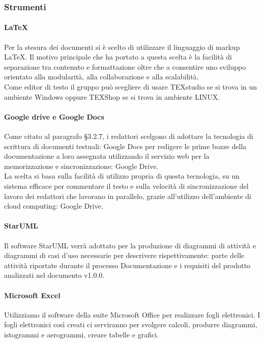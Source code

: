         \subsubsection{Strumenti}
            \paragraph{LaTeX}
                Per la stesura dei documenti si è scelto di utilizzare il linguaggio di markup LaTeX. Il motivo principale che ha portato a questa scelta è la facilità di separazione tra contenuto e formattazione oltre che a consentire uno sviluppo orientato alla modularità, alla collaborazione e alla scalabilità.\\
                Come editor di testo il gruppo può scegliere di usare TEXstudio se si trova in un ambiente Windows oppure TEXShop se si trova in ambiente LINUX.  \\
            \paragraph{Google drive e Google Docs}
                Come citato al paragrafo §3.2.7, i redattori scelgono di adottare la tecnologia di scrittura di documenti testuali: Google Docs per redigere le prime bozze della documentazione a loro assegnata utilizzando il servizio web per la memorizzazione e sincronizzazione: Google Drive. \\
                La scelta si basa sulla facilità di utilizzo propria di questa tecnologia, su un sistema efficace per commentare il testo e sulla velocità di sincronizzazione del lavoro dei redattori che lavorano in parallelo, grazie all’utilizzo dell’ambiente di cloud computing: Google Drive. \\
            \paragraph{StarUML}
                Il software StarUML verrà adottato per la produzione di diagrammi di attività e diagrammi di casi d’uso necessarie per descrivere rispettivamente: parte delle attività riportate durante il processo Documentazione e i requisiti del prodotto analizzati nel documento  v1.0.0.
            \paragraph{Microsoft Excel}
                Utilizziamo il software della suite Microsoft Office per realizzare fogli elettronici. I fogli elettronici così creati ci serviranno per svolgere calcoli, produrre diagrammi, istogrammi e aerogrammi, creare tabelle e grafici.
